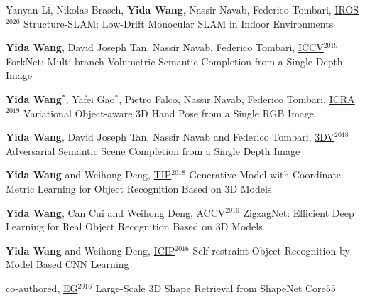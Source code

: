 \begin{cventries}
\begin{enumerate}[label={[\arabic*]}, leftmargin=*]
\item
\cvpublication
{Yanyan Li, Nikolas Brasch, \textbf{Yida Wang}, Nassir Navab, Federico Tombari, \underline{IROS}$^{2020}$} %
{Structure-SLAM: Low-Drift Monocular SLAM in Indoor Environments} %
{} %
{} %

\item
\cvpublication
{\textbf{Yida Wang}, David Joseph Tan, Nassir Navab, Federico Tombari, \underline{ICCV}$^{2019}$} %
{ForkNet: Multi-branch Volumetric Semantic Completion from a Single Depth Image} %
{} %
{} %

\item
\cvpublication
{\textbf{Yida Wang}$^*$, Yafei Gao$^*$, Pietro Falco, Nassir Navab, Federico Tombari, \underline{ICRA}$^{2019}$ \href{https://www.youtube.com/watch?v=tSTQ2NTqB4A}{}} %
{Variational Object-aware 3D Hand Pose from a Single RGB Image} %
{} %
{} %

\item
\cvpublication
{\textbf{Yida Wang}, David Joseph Tan, Nassir Navab and Federico Tombari, \underline{3DV}$^{2018}$ \href{https://www.youtube.com/watch?v=udvBhkupwXE&t=1s}{}} %
{Adversarial Semantic Scene Completion from a Single Depth Image} %
{} %
{} %

\item
\cvpublication
{\textbf{Yida Wang} and Weihong Deng, \underline{TIP}$^{2018}$} %
{Generative Model with Coordinate Metric Learning for Object Recognition Based on 3D Models} %
{} %
{} %


\item
\cvpublication
{\textbf{Yida Wang}, Can Cui and Weihong Deng, \underline{ACCV}$^{2016}$} %
{ZigzagNet: Efficient Deep Learning for Real Object Recognition Based on 3D Models} %
{} %
{} %


\item
\cvpublication
{\textbf{Yida Wang} and Weihong Deng, \underline{ICIP}$^{2016}$} %
{Self-restraint Object Recognition by Model Based CNN Learning} %
{} %
{} %


\item
\cvpublication
{co-authored, \underline{EG}$^{2016}$} %
{Large-Scale 3D Shape Retrieval from ShapeNet Core55} %
{} %
{} %


\end{enumerate}


\end{cventries}
